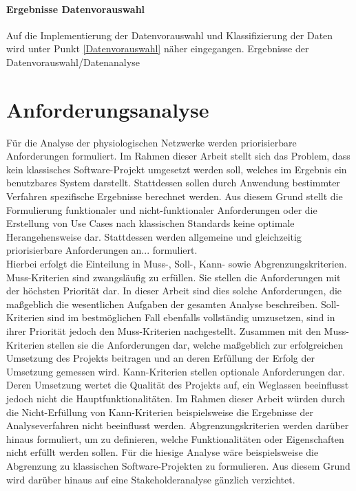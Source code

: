 \paragraph{Ergebnisse Datenvorauswahl} Auf die Implementierung der Datenvorauswahl und Klassifizierung der Daten wird unter Punkt \ref{Datenvorauswahl} näher eingegangen. Ergebnisse der Datenvorauswahl/Datenanalyse\\



\section{Anforderungsanalyse}

Für die Analyse der physiologischen Netzwerke werden priorisierbare Anforderungen formuliert. Im Rahmen dieser Arbeit stellt sich das Problem, dass kein klassisches Software-Projekt umgesetzt werden soll, welches im Ergebnis ein benutzbares System darstellt. Stattdessen sollen durch Anwendung bestimmter Verfahren spezifische Ergebnisse berechnet werden. Aus diesem Grund stellt die Formulierung funktionaler und nicht-funktionaler Anforderungen oder die Erstellung von Use Cases nach klassischen Standards keine optimale Herangehensweise dar. Stattdessen werden allgemeine und gleichzeitig priorisierbare Anforderungen an... formuliert.\\

Hierbei erfolgt die Einteilung in Muss-, Soll-, Kann- sowie Abgrenzungskriterien. Muss-Kriterien sind zwangsläufig zu erfüllen. Sie stellen die Anforderungen mit der höchsten Priorität dar. In dieser Arbeit sind dies solche Anforderungen, die maßgeblich die wesentlichen Aufgaben der gesamten Analyse beschreiben. Soll-Kriterien sind im bestmöglichen Fall ebenfalls vollständig umzusetzen, sind in ihrer Priorität jedoch den Muss-Kriterien nachgestellt. Zusammen mit den Muss-Kriterien stellen sie die Anforderungen dar, welche maßgeblich zur erfolgreichen Umsetzung des Projekts beitragen und an deren Erfüllung der Erfolg der Umsetzung gemessen wird. Kann-Kriterien stellen optionale Anforderungen dar. Deren Umsetzung wertet die Qualität des Projekts auf, ein Weglassen beeinflusst jedoch nicht die Hauptfunktionalitäten. Im Rahmen dieser Arbeit würden durch die Nicht-Erfüllung von Kann-Kriterien beispielsweise die Ergebnisse der Analyseverfahren nicht beeinflusst werden. Abgrenzungskriterien werden darüber hinaus formuliert, um zu definieren, welche Funktionalitäten oder Eigenschaften nicht erfüllt werden sollen. Für die hiesige Analyse wäre beispielsweise die Abgrenzung zu klassischen Software-Projekten zu formulieren. Aus diesem Grund wird darüber hinaus auf eine Stakeholderanalyse gänzlich verzichtet.\\

